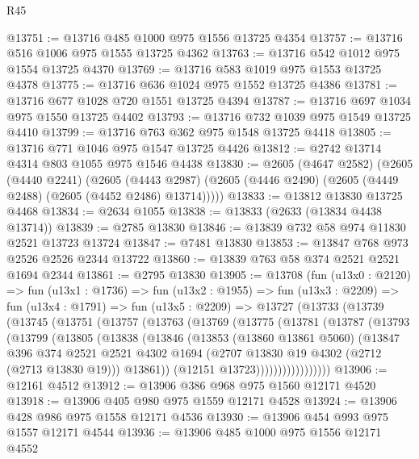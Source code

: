 \begin{lexlean}{R45}
\begin{coremodule}
@13751 := @13716 @485 @1000 @975 @1556 @13725 @4354
@13757 := @13716 @516 @1006 @975 @1555 @13725 @4362
@13763 := @13716 @542 @1012 @975 @1554 @13725 @4370
@13769 := @13716 @583 @1019 @975 @1553 @13725 @4378
@13775 := @13716 @636 @1024 @975 @1552 @13725 @4386
@13781 := @13716 @677 @1028 @720 @1551 @13725 @4394
@13787 := @13716 @697 @1034 @975 @1550 @13725 @4402
@13793 := @13716 @732 @1039 @975 @1549 @13725 @4410
@13799 := @13716 @763 @362 @975 @1548 @13725 @4418
@13805 := @13716 @771 @1046 @975 @1547 @13725 @4426
@13812 := @2742 @13714 @4314 @803 @1055 @975 @1546 @4438
@13830 := @2605
    (@4647 @2582)
    (@2605
      (@4440 @2241)
      (@2605
        (@4443 @2987)
        (@2605 (@4446 @2490) (@2605 (@4449 @2488) (@2605 (@4452 @2486) @13714)))))
@13833 := @13812 @13830 @13725 @4468
@13834 := @2634 @1055
@13838 := @13833 (@2633 (@13834 @4438 @13714))
@13839 := @2785 @13830
@13846 := @13839 @732 @58 @974 @11830 @2521 @13723 @13724
@13847 := @7481 @13830
@13853 := @13847 @768 @973 @2526 @2526 @2344 @13722
@13860 := @13839 @763 @58 @374 @2521 @2521 @1694 @2344
@13861 := @2795 @13830
@13905 := @13708
    (fun (u13x0 : @2120) =>
    fun (u13x1 : @1736) =>
    fun (u13x2 : @1955) =>
    fun (u13x3 : @2209) =>
    fun (u13x4 : @1791) =>
    fun (u13x5 : @2209) =>
    @13727
      (@13733
        (@13739
          (@13745
            (@13751
              (@13757
                (@13763
                  (@13769
                    (@13775
                      (@13781
                        (@13787
                          (@13793
                            (@13799
                              (@13805
                                (@13838
                                  (@13846
                                    (@13853
                                      (@13860 @13861 @5060)
                                      (@13847
                                        @396
                                        @374
                                        @2521
                                        @2521
                                        @4302
                                        @1694
                                        (@2707 @13830 @19 @4302 (@2712 (@2713 @13830 @19)))
                                        @13861))
                                    (@12151 @13723)))))))))))))))))
@13906 := @12161 @4512
@13912 := @13906 @386 @968 @975 @1560 @12171 @4520
@13918 := @13906 @405 @980 @975 @1559 @12171 @4528
@13924 := @13906 @428 @986 @975 @1558 @12171 @4536
@13930 := @13906 @454 @993 @975 @1557 @12171 @4544
@13936 := @13906 @485 @1000 @975 @1556 @12171 @4552

\end{coremodule}
\end{lexlean}
